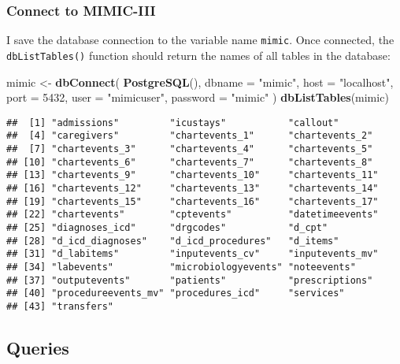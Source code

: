 \documentclass[]{article}
\newenvironment{Shaded}{\begin{snugshade}}{\end{snugshade}}
\newcommand{\KeywordTok}[1]{\textcolor[rgb]{0.13,0.29,0.53}{\textbf{#1}}}
\newcommand{\DataTypeTok}[1]{\textcolor[rgb]{0.13,0.29,0.53}{#1}}
\newcommand{\DecValTok}[1]{\textcolor[rgb]{0.00,0.00,0.81}{#1}}
\newcommand{\StringTok}[1]{\textcolor[rgb]{0.31,0.60,0.02}{#1}}
\newcommand{\NormalTok}[1]{#1}
\begin{document}
\subsubsection{Connect to MIMIC-III}\label{connect-to-mimic-iii}

I save the database connection to the variable name \texttt{mimic}. Once
connected, the \texttt{dbListTables()} function should return the names
of all tables in the database:

\begin{Shaded}
\begin{Highlighting}[]
\NormalTok{mimic <-}\StringTok{ }\KeywordTok{dbConnect}\NormalTok{(}
  \KeywordTok{PostgreSQL}\NormalTok{(),}
  \DataTypeTok{dbname =} \StringTok{"mimic"}\NormalTok{,}
  \DataTypeTok{host =} \StringTok{"localhost"}\NormalTok{,}
  \DataTypeTok{port =} \DecValTok{5432}\NormalTok{,}
  \DataTypeTok{user =} \StringTok{"mimicuser"}\NormalTok{,}
  \DataTypeTok{password =} \StringTok{"mimic"}
\NormalTok{)}
\KeywordTok{dbListTables}\NormalTok{(mimic)}
\end{Highlighting}
\end{Shaded}

\begin{verbatim}
##  [1] "admissions"         "icustays"           "callout"           
##  [4] "caregivers"         "chartevents_1"      "chartevents_2"     
##  [7] "chartevents_3"      "chartevents_4"      "chartevents_5"     
## [10] "chartevents_6"      "chartevents_7"      "chartevents_8"     
## [13] "chartevents_9"      "chartevents_10"     "chartevents_11"    
## [16] "chartevents_12"     "chartevents_13"     "chartevents_14"    
## [19] "chartevents_15"     "chartevents_16"     "chartevents_17"    
## [22] "chartevents"        "cptevents"          "datetimeevents"    
## [25] "diagnoses_icd"      "drgcodes"           "d_cpt"             
## [28] "d_icd_diagnoses"    "d_icd_procedures"   "d_items"           
## [31] "d_labitems"         "inputevents_cv"     "inputevents_mv"    
## [34] "labevents"          "microbiologyevents" "noteevents"        
## [37] "outputevents"       "patients"           "prescriptions"     
## [40] "procedureevents_mv" "procedures_icd"     "services"          
## [43] "transfers"
\end{verbatim}

\subsection{Queries}\label{queries}
\end{document}
